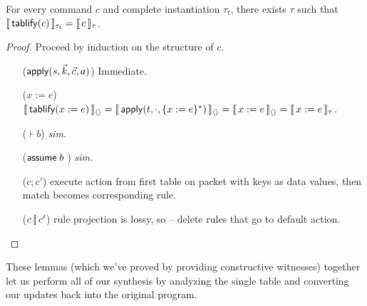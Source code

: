 \begin{lemma}
  \label{lem:pretablifiedinst}
  For every command $c$ and complete instantiation $\tau_t$, there
  exists $\tau$ such that $\llbracket\,\mathsf{tablify}{(c)}\,\rrbracket_{\tau_t} = \llbracket\,c\,\rrbracket_\tau$.
\end{lemma}

\begin{proof}
Proceed by induction on the structure of $c$.
\begin{enumerate}[align=left]
  \item[($\mathsf{apply}(s, \vec k, \vec c, a)$)] Immediate.
  \item[($x := e$)] $\llbracket\,\mathsf{tablify}{(x := e)}\,\rrbracket_{\langle \rangle} = \llbracket\,\mathsf{apply}(t,\cdot, \{x := e\}^*)\,\rrbracket_{\langle \rangle} = \llbracket\,x:=e\,\rrbracket_{\langle \rangle} = \llbracket\,x:=e\,\rrbracket_{\tau}$.
  \item[($\assert b$)] \textit{sim.}
  \item[($\mathsf{assume}\; b\;$)] \textit{sim.}

  \item[($c;c'$)] execute action from first table on packet with keys
    as data values, then match becomes corresponding rule.
  \item[($c \operatorname*{\left[\!\right]} c'$)] rule projection is lossy, so -- delete rules
    that go to default action.
\end{enumerate}
\end{proof}

These lemmas (which we've proved by providing constructive witnesses)
together let us perform all of our synthesis by analyzing the single
table and converting our updates back into the original program.

